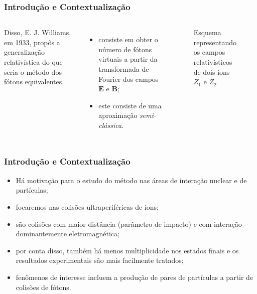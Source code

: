 \documentclass[xcolor=dvipsnames]{beamer}
\renewcommand{\vec}{\mathbf}
\begin{document}
\begin{frame}
	\frametitle{Introdução e Contextualização}
	\begin{columns}
		Disso, E. J. Williams, em 1933, propôs a generalização relativística do
		que seria o método dos fótons equivalentes.
		\begin{itemize}
			\item consiste em obter o número de fótons virtuais a partir da 
				transformada de Fourier dos campos $\vec{E}$ e $\vec{B}$;
			\item este consiste de uma aproximação \textit{semi-clássica}.
		\end{itemize}

		\begin{figure}
			
			\caption{Esquema representando os campos relativísticos de dois íons
			$Z_1$ e $Z_2$}
		\end{figure}
	\end{columns}
\end{frame}

\begin{frame}
	\frametitle{Introdução e Contextualização}
	\begin{itemize}
		\item Há motivação para o estudo do método nas áreas de interação
			nuclear e de partículas;
		\item focaremos nas colisões ultraperiféricas de íons;
		\item são colisões com maior distância (parâmetro de impacto) e com
			interação dominantemente eletromagnética;
		\item por conta disso, também há menos multiplicidade nos estados
			finais e os resultados experimentais são mais facilmente tratados;
		\item fenômenos de interesse incluem a produção de pares de partículas
			a partir de colisões de fótons.
	\end{itemize}
\end{frame}
\end{document}
